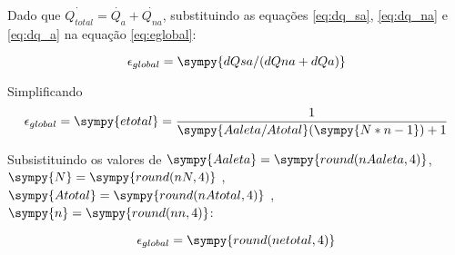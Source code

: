 \documentclass[a4paper,11pt]{article}
\newcommand{\npy}[1]{\sympy{round(n#1,4)}}
\begin{document}
Dado que $\dot{Q_{total}} = \dot{Q_a} + \dot{Q_{na}}$, substituindo as equações \ref{eq:dq_sa}, \ref{eq:dq_na} e \ref{eq:dq_a} na equação \ref{eq:eglobal}:

$$
\epsilon_{global} = \sympy{dQsa/(dQna+dQa)}
$$

Simplificando
\begin{equation}\label{eq:eglobal2}
\epsilon_{global} = \sympy{etotal} = \frac{1}{\sympy{Aaleta/Atotal}(\sympy{N*n -1})+1}
\end{equation}

Subsistituindo os valores de $\sympy{Aaleta} = \npy{Aaleta}$, $\sympy{N} = \npy{N}$ , $\sympy{Atotal} = \npy{Atotal}$ , $\sympy{n} = \npy{n}$:

$$
\epsilon_{global} = \npy{etotal}
$$

\end{document}
